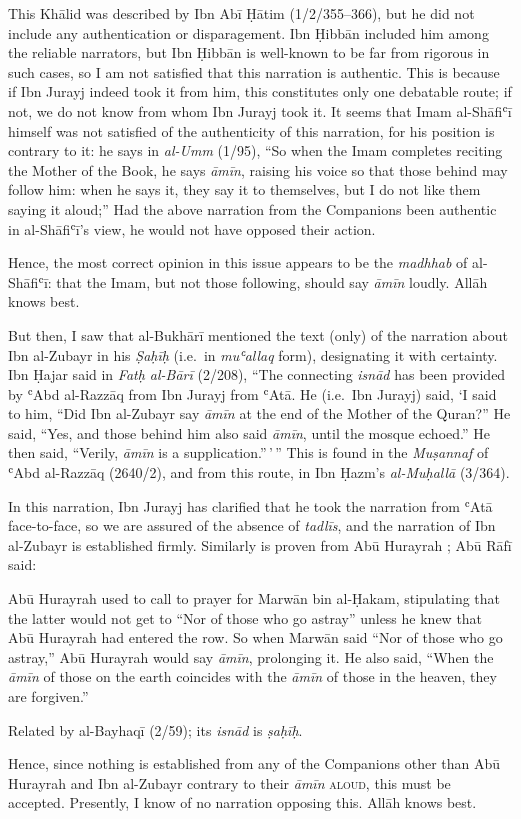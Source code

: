 This Khālid was described by Ibn Abī Ḥātim (1/2/355--366), but he did
not include any authentication or disparagement. Ibn Ḥibbān included him
among the reliable narrators, but Ibn Ḥibbān is well-known to be far
from rigorous in such cases, so I am not satisfied that this narration
is authentic. This is because if Ibn Jurayj indeed took it from him,
this constitutes only one debatable route; if not, we do not know from
whom Ibn Jurayj took it. It seems that Imam al-Shāfiʿī himself was not
satisfied of the authenticity of this narration, for his position is
contrary to it: he says in \emph{al-Umm} (1/95), ``So when the Imam
completes reciting the Mother of the Book, he says \emph{āmīn}, raising
his voice so that those behind may follow him: when he says it, they say
it to themselves, but I do not like them saying it aloud;'' Had the
above narration from the Companions been authentic in al-Shāfiʿī's view,
he would not have opposed their action.

Hence, the most correct opinion in this issue appears to be the
\emph{madhhab} of al-Shāfiʿī: that the Imam, but not those following,
should say \emph{āmīn} loudly. Allāh knows best.

But then, I saw that al-Bukhārī mentioned the text (only) of the
narration about Ibn al-Zubayr in his \emph{Ṣaḥīḥ} (i.e.~in
\emph{muʿallaq} form), designating it with certainty. Ibn Ḥajar said in
\emph{Fatḥ al-Bārī} (2/208), ``The connecting \emph{isnād} has been
provided by ʿAbd al-Razzāq from Ibn Jurayj from ʿAtā. He (i.e.~Ibn
Jurayj) said, `I said to him, ``Did Ibn al-Zubayr say \emph{āmīn} at the
end of the Mother of the Quran?'' He said, ``Yes, and those behind him
also said \emph{āmīn}, until the mosque echoed.'' He then said,
``Verily, \emph{āmīn} is a supplication.''\,'\,'' This is found in the
\emph{Muṣannaf} of ʿAbd al-Razzāq (2640/2), and from this route, in Ibn
Ḥazm's \emph{al-Muḥallā} (3/364).

In this narration, Ibn Jurayj has clarified that he took the narration
from ʿAtā face-to-face, so we are assured of the absence of
\emph{tadlīs}, and the narration of Ibn al-Zubayr is established firmly.
Similarly is proven from Abū Hurayrah \mabpwhim; Abū Rāfī said:

\begin{mdframed}[style=narration, frametitle={Narration}]
Abū Hurayrah used to call to prayer for Marwān bin al-Ḥakam, stipulating that the latter would not get to “Nor of those who go astray” unless he knew that Abū Hurayrah had entered the row. So when Marwān said “Nor of those who go astray,” Abū Hurayrah would say \textit{āmīn}, prolonging it. He also said, “When the \textit{āmīn} of those on the earth coincides with the \textit{āmīn} of those in the heaven, they are forgiven.”
\end{mdframed}

Related by al-Bayhaqī (2/59); its \emph{isnād} is \emph{ṣaḥīḥ}.

Hence, since nothing is established from any of the Companions other
than Abū Hurayrah and Ibn al-Zubayr \mabpwthem contrary to their
\emph{āmīn} \textsc{aloud}, this must be accepted. Presently, I know of
no narration opposing this. Allāh knows best.
